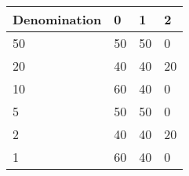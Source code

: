 \begin{tabular}{llll}
    Denomination & 0  & 1  & 2  \\
    \hline
    50           & 50 & 50 & 0  \\
    20           & 40 & 40 & 20 \\
    10           & 60 & 40 & 0  \\
    5            & 50 & 50 & 0  \\
    2            & 40 & 40 & 20 \\
    1            & 60 & 40 & 0  \\
    \hline
\end{tabular}